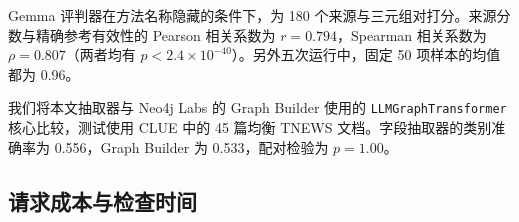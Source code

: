 Gemma 评判器在方法名称隐藏的条件下，为 180 个来源与三元组对打分。来源分数与精确参考有效性的 Pearson 相关系数为 $r=0.794$，Spearman 相关系数为 $\rho=0.807$（两者均有 $p<2.4\times10^{-40}$）。另外五次运行中，固定 50 项样本的均值都为 0.96。

我们将本文抽取器与 Neo4j Labs 的 Graph Builder 使用的 \texttt{LLMGraphTransformer} 核心\citep{ref_neo4j_llm_graph_builder}比较，测试使用 CLUE 中的 45 篇均衡 TNEWS 文档\citep{ref_clue2020}。字段抽取器的类别准确率为 0.556，Graph Builder 为 0.533，配对检验为 $p=1.00$。

\subsection{请求成本与检查时间}
\begin{table}[t]
\centering
\caption{请求成本。平均时间包含重试和请求间隔等待。来源设置与排队时间另计。}
\label{tab:matched_cost}
\small
{}
\end{table}
\begin{table}[t]
\centering
\caption{图报告的时间和内存。内存统计新增批次存储峰值，单位为 MiB，源文本共享。}
\label{tab:diagnostic_scaling}
\small
{}
\end{table}

